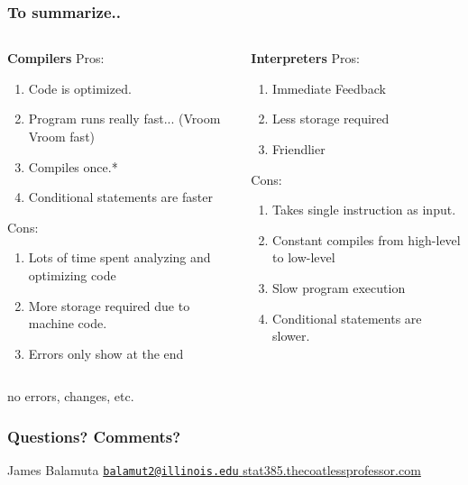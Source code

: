 \documentclass{beamer}\usepackage[]{graphicx}\usepackage[]{color}
\begin{document}
\begin{frame}
\frametitle{To summarize..}
  \begin{columns}
    \begin{column}{.5\linewidth}
\textbf{Compilers}
Pros:
\begin{enumerate}
  \item Code is optimized.
  \item Program runs really fast... (Vroom Vroom fast)
  \item Compiles once.*
  \item Conditional statements are faster
\end{enumerate}
Cons:
\begin{enumerate}
  \item Lots of time spent analyzing and optimizing code
  \item More storage required due to machine code.
  \item Errors only show at the end
\end{enumerate}
    \end{column}
    \begin{column}{.5\linewidth}
\textbf{Interpreters}
Pros:
\begin{enumerate}
  \item Immediate Feedback
  \item Less storage required
  \item Friendlier
\end{enumerate}
Cons:
\begin{enumerate}
  \item Takes single instruction as input.
  \item Constant compiles from high-level to low-level
  \item Slow program execution
  \item Conditional statements are slower.
\end{enumerate}
    \end{column}
  \end{columns}
  
\flushright *no errors, changes, etc.

\end{frame}



\begin{frame}
\frametitle{Questions? Comments?}

\centering
\Huge
James Balamuta
\href{mailto:balamut2@illinois.edu}{\nolinkurl{balamut2@illinois.edu} }
\href{http://stat385.thecoatlessprofessor.com}{stat385.thecoatlessprofessor.com}


\end{frame}
\end{document}

